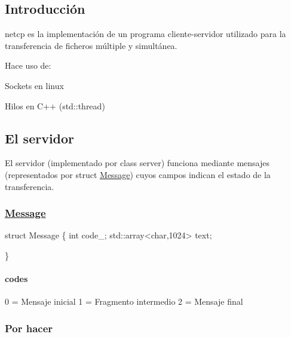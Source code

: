 \subsection*{Introducción}

{\ttfamily netcp} es la implementación de un programa cliente-\/servidor utilizado para la transferencia de ficheros múltiple y simultánea.

Hace uso de\+:
\begin{DoxyItemize}
\item Sockets en linux
\item Hilos en C++ ({\ttfamily std\+::thread})
\end{DoxyItemize}

\subsection*{El servidor}

El servidor (implementado por {\ttfamily class server}) funciona mediante mensajes (representados por {\ttfamily struct \hyperlink{structMessage}{Message}}) cuyos campos indican el estado de la transferencia. \subsubsection*{\hyperlink{structMessage}{Message}}


\begin{DoxyCode}
struct Message \{
  int code\_;
  std::array<char,1024> text;

\}
\end{DoxyCode}
 \paragraph*{codes}

0 = Mensaje inicial 1 = Fragmento intermedio 2 = Mensaje final

\subsubsection*{Por hacer}


